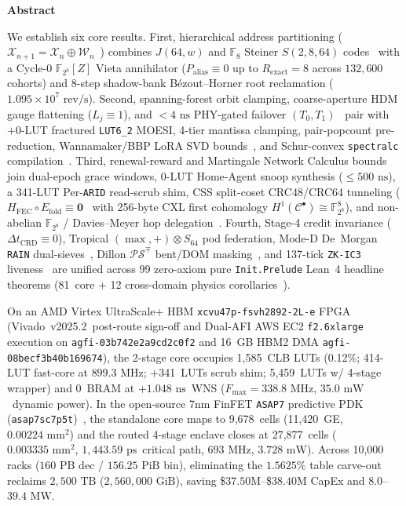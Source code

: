 \documentclass[11pt,letterpaper]{article}
\renewenvironment{abstract}{%
  \par\vspace{-3pt}%
  \begingroup
  \leftskip=0.016\textwidth
  \rightskip=0.016\textwidth
  \noindent{\color{black!55}\hrule height 0.4pt}\vspace{1.8pt}%
  \centerline{\bfseries\small Abstract}\vspace{0.8pt}%
  \fontsize{7.95}{9.15}\selectfont
  \setlength{\parskip}{1.35pt}%
  \setlength{\parindent}{0pt}%
}{%
  \par\vspace{1.8pt}\noindent{\color{black!55}\hrule height 0.4pt}%
  \par\endgroup
  \vspace{-2pt}%
}
\providecommand{\VivadoToolVersion}{v2025.2}
\providecommand{\LeanTheoremTotal}{81}
\providecommand{\CoreClbLuts}{1,585}
\providecommand{\ScrubShimLuts}{341}
\providecommand{\WrapperLuts}{5,459}
\providecommand{\FastCoreLuts}{414}
\providecommand{\FastCoreFmax}{\ensuremath{899.3\text{~MHz}}}
\providecommand{\CoreWns}{\ensuremath{+1.048\text{~ns}}}
\providecommand{\CoreFmax}{\ensuremath{338.8\text{~MHz}}}
\providecommand{\CorePowerMw}{\ensuremath{35.0\text{~mW}}}
\providecommand{\AwsAgfiId}{agfi-03b742e2a9cd2c0f2}
\providecommand{\AwsHbmAgfiId}{agfi-08becf3b40b169674}
\providecommand{\AsicCoreCells}{9,678}
\providecommand{\AsicCoreGe}{11,420}
\providecommand{\AsicCoreAreaMm}{\ensuremath{0.00224\text{~mm}^2}}
\providecommand{\AsicStandardCells}{27,877}
\providecommand{\AsicEnclaveAreaMm}{\ensuremath{0.003335\text{~mm}^2}}
\providecommand{\AsicStageOneTwoDelayPs}{\ensuremath{1,443.59\text{~ps}}}
\providecommand{\AsicFmaxMhz}{\ensuremath{693\text{~MHz}}}
\providecommand{\AsicTotalPowerMw}{\ensuremath{3.728\text{~mW}}}
\providecommand{\CorePhysicalLUTs}{\CoreClbLuts}
\providecommand{\CoreLUTUtilPct}{0.12\%}
\providecommand{\ScrubShimPhysicalLUTs}{\ScrubShimLuts}
\providecommand{\WrapperEnclaveLUTs}{\WrapperLuts}
\providecommand{\CoreBRAM}{0}
\providecommand{\PostRouteSetupWNS}{\CoreWns}
\providecommand{\PostRouteFmaxMHz}{\CoreFmax}
\providecommand{\PostRouteDynPowerMW}{\CorePowerMw}
\theoremstyle{spectralthm}
\begin{document}
\begin{abstract}
We establish six core results. First, hierarchical address partitioning ($\mathcal{X}_{n+1} = \mathcal{X}_n \oplus \mathcal{W}_n$~\cite{chen2001multilevel}) combines $J(64,w)$ and $\mathbb{F}_8$ Steiner $S(2,8,64)$ codes~\cite{welch1974lower, kautz1964nonrandom} with a Cycle-0 $\mathbb{F}_{2^8}[Z]$ Vieta annihilator ($P_{\mathrm{alias}} \equiv 0$ up to $R_{\mathrm{exact}} = 8$ across $132,600$ cohorts) and 8-step shadow-bank B\'{e}zout--Horner root reclamation ($1.095\times 10^7\text{~rev/s}$). Second, spanning-forest orbit clamping, coarse-aperture HDM gauge flattening ($L_j \equiv 1$), and $<4\text{~ns}$ PHY-gated failover $(T_0,T_1)$~\cite{tutte1961problem, nashwilliams1961edge} pair with $+0$-LUT fractured \mbox{\texttt{LUT6\_2}} MOESI, 4-tier mantissa clamping, pair-popcount pre-reduction, Wannamaker/BBP LoRA SVD bounds~\cite{wannamaker2000nonsubtractive, benaych2012singular}, and Schur-convex \texttt{spectralc} compilation~\cite{mcconnell2011certifying, doe2025genesis}. Third, renewal-reward and Martingale Network Calculus bounds~\cite{poloczek2014martingale} join dual-epoch grace windows, 0-LUT Home-Agent snoop synthesis ($\le 500\text{~ns}$), a \ScrubShimPhysicalLUTs-LUT Per-\texttt{ARID} read-scrub shim, CSS split-coset CRC48/CRC64 tunneling ($H_{\mathrm{FEC}} \circ E_{\mathrm{fold}} \equiv \mathbf{0}$~\cite{calderbank1996good} with 256-byte CXL first cohomology $H^1(\mathcal{C}^\bullet) \cong \mathbb{F}_{2^8}^8$), and non-abelian $\mathbb{F}_{2^8}$ / Davies--Meyer hop delegation~\cite{daemen1995cipher, birgisson2014macaroons}. Fourth, Stage-4 credit invariance ($\Delta t_{\mathrm{CRD}} \equiv 0$), Tropical $(\max,+) \otimes S_{64}$ pod federation, Mode-D De~Morgan \texttt{RAIN} dual-sieves~\cite{mitra2000commonmode}, Dillon $\mathcal{PS}^\mp$ bent/DOM masking~\cite{gross2016dom, dillon1974elementary}, and 137-tick \texttt{ZK-IC3} liveness~\cite{chakarov2013probabilistic} are unified across 99 zero-axiom pure \texttt{Init.Prelude} Lean~4 headline theorems (\LeanTheoremTotal\ core + 12 cross-domain physics corollaries~\cite{demoura2021lean4}).

On an AMD Virtex UltraScale+ HBM \texttt{xcvu47p-fsvh2892-2L-e} FPGA (Vivado~\VivadoToolVersion\ post-route sign-off and Dual-AFI AWS EC2 \texttt{f2.6xlarge} execution on \texttt{\AwsAgfiId} and 16~GB HBM2 DMA \texttt{\AwsHbmAgfiId}), the 2-stage core occupies \CorePhysicalLUTs\ CLB LUTs (\CoreLUTUtilPct; \FastCoreLuts-LUT fast-core at \FastCoreFmax; +\ScrubShimPhysicalLUTs\ LUTs scrub shim; \WrapperEnclaveLUTs\ LUTs w/ 4-stage wrapper) and \CoreBRAM\ BRAM at \PostRouteSetupWNS\ WNS ($F_{\max} = \PostRouteFmaxMHz$, \PostRouteDynPowerMW\ dynamic power). In the open-source 7nm FinFET \texttt{ASAP7} predictive PDK (\texttt{asap7sc7p5t})~\cite{clark2016asap7}, the standalone core maps to \AsicCoreCells\ cells (\AsicCoreGe\ GE, \AsicCoreAreaMm) and the routed 4-stage enclave closes at \AsicStandardCells\ cells (\AsicEnclaveAreaMm, \AsicStageOneTwoDelayPs\ critical path, \AsicFmaxMhz, \AsicTotalPowerMw). Across 10,000 racks ($160\text{~PB}$ dec / $156.25\text{~PiB}$ bin), eliminating the $1.5625\%$ table carve-out reclaims $2,500\text{~TB}$ ($2,560,000\text{~GiB}$), saving \$$37.50\text{M}$--\$$38.40\text{M}$ CapEx and $8.0$--$39.4\text{~MW}$.
\end{abstract}
\end{document}
